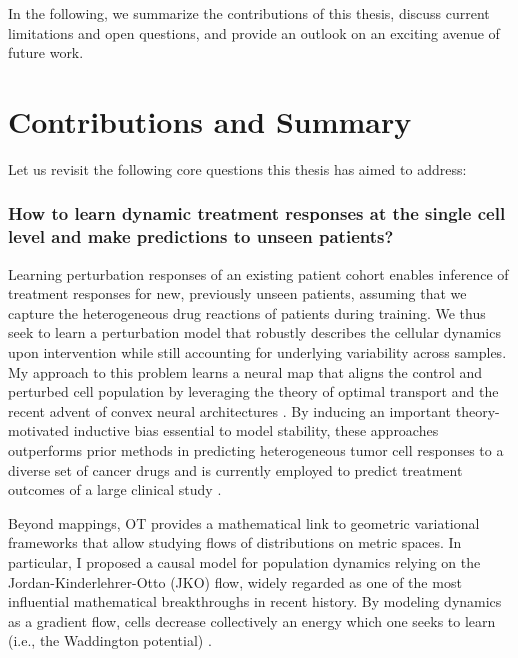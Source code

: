 In the following, we summarize the contributions of this thesis, discuss current limitations and open questions, and provide an outlook on an exciting avenue of future work.

\section*{Contributions and Summary}

Let us revisit the following core questions this thesis has aimed to address:

\subsubsection*{\textbf{How to learn dynamic treatment responses at the single cell level and make predictions to unseen patients?}}

 Learning perturbation responses of an existing patient cohort enables inference of treatment responses for new, previously unseen patients, assuming that we capture the heterogeneous drug reactions of patients during training.
We thus seek to learn a perturbation model that robustly describes the cellular dynamics upon intervention while still accounting for underlying variability across samples.
My approach to this problem learns a neural map that aligns the control and perturbed cell population by leveraging the theory of optimal transport and the recent advent of convex neural architectures \citep{bunne2021learning}.
By inducing an important theory-motivated inductive bias essential to model stability, these approaches outperforms prior methods in predicting heterogeneous tumor cell responses to a diverse set of cancer drugs and is currently employed to predict treatment outcomes of a large clinical study \citep{irmisch2021tumor}.

Beyond mappings, OT provides a mathematical link to geometric variational frameworks that allow studying flows of distributions on metric spaces.
In particular, I proposed a causal model for population dynamics relying on the Jordan-Kinderlehrer-Otto (JKO) flow, widely regarded as one of the most influential mathematical breakthroughs in recent history. By modeling dynamics as a gradient flow, cells decrease collectively an energy which one seeks to learn (i.e., the Waddington potential) \citep[\textrm{i.}]{bunne2022proximal}. 

